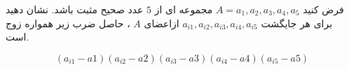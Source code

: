 \exercise
فرض کنيد 
$A = {a_1, a_2, a_3, a_4, a_5}$
 مجموعه ای از 
$5$
  عدد صحيح مثبت باشد. نشان دهيد برای هر جايگشت
$a_{i1}, a_{i2}, a_{i3}, a_{i4}, a_{i5}$
  ازاعضای 
$A$
  ، حاصل ضرب زير همواره زوج است.
  
$$(a_{i1}-a1)(a_{i2}-a2)(a_{i3}-a3)(a_{i4}-a4)(a_{i5}-a5)$$